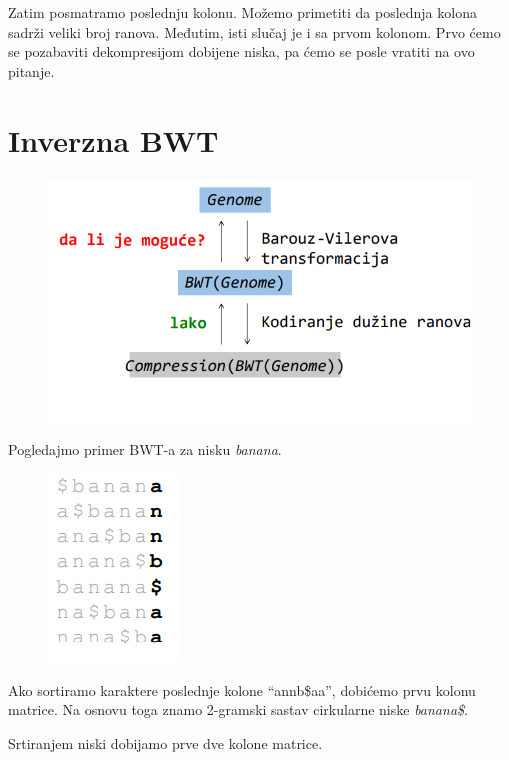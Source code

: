Zatim posmatramo poslednju kolonu. Možemo primetiti da poslednja kolona sadrži veliki broj ranova. Međutim, isti slučaj je i sa prvom kolonom. Prvo ćemo se pozabaviti dekompresijom dobijene niska, pa ćemo se posle vratiti na ovo pitanje.


\section{Inverzna BWT}



\begin{figure}[h!]
\centering
\includegraphics[scale=0.5]{poglavlja/9/slike/KakoDekompresiju.png}
\caption{}
\label{slika:X}
\end{figure}


Pogledajmo primer BWT-a za nisku \textit{banana}.


\begin{figure}[h!]
\centering
\includegraphics[scale=0.5]{poglavlja/9/slike/banana.png}
\caption{}
\label{slika:X}
\end{figure}


Ako sortiramo karaktere poslednje kolone “annb\$aa”, dobićemo prvu kolonu matrice. Na osnovu toga znamo 2-gramski sastav cirkularne niske \textit{banana\$}.

Srtiranjem niski dobijamo prve dve kolone matrice.

